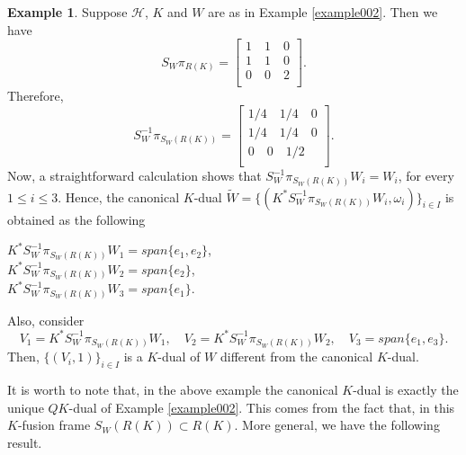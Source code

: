 \documentclass{birkjour}
\theoremstyle{definition}
\newtheorem{ex}[thm]{Example}
\theoremstyle{remark}
\numberwithin{equation}{section}
\begin{document}
\begin{ex}\label{example2}
Suppose  $\mathcal{H}$, $K$ and $W$  are as in Example \ref{example002}. Then 
we have
\begin{equation*}
S_{W}\pi_{R(K)} = \left[
 \begin{array}{ccc}

1 \quad 1 \quad 0\\

1 \quad 1 \quad 0\\

0 \quad 0 \quad 2\\

\end{array} \right].
\end{equation*}
Therefore,
\begin{equation*}
S_{W}^{-1}\pi_{S_{W}(R(K))} = \left[
 \begin{array}{ccc}

1/4 \quad 1/4 \quad 0\\

1/4 \quad 1/4 \quad 0\\

0 \quad 0 \quad 1/2\\

\end{array} \right].
\end{equation*}
Now, a straightforward calculation shows that
$S_{W}^{-1}\pi_{S_{W}(R(K))}W_{i} = W_{i}$, for every $1 \leq i\leq 3$. Hence, the canonical $K$-dual $\widetilde{W} = \lbrace
(K^{*}S_{W}^{-1}\pi_{S_{W}(R(K))}W_{i},\omega_{i})\rbrace_{i\in I}$ is obtained as the following

\begin{center}
$K^{*}S_{W}^{-1}\pi_{S_{W}(R(K))} W_{1} =  \textit{span}\lbrace e_{1}, e_{2}\rbrace$, \\
$K^{*}S_{W}^{-1}\pi_{S_{W}(R(K))} W_{2} =  \textit{span}\lbrace e_{2}\rbrace$, \\
$K^{*}S_{W}^{-1}\pi_{S_{W}(R(K))} W_{3} =  \textit{span}\lbrace e_{1}\rbrace$.
\end{center}
Also, consider
\begin{equation*}
V_{1} = K^{*}S_{W}^{-1}\pi_{S_{W}(R(K))} W_{1},\quad V_{2} =K^{*}S_{W}^{-1}\pi_{S_{W}(R(K))} W_{2},\quad V_{3} = \textit{span}\lbrace e_{1}, e_{3}\rbrace.
\end{equation*}
Then, $\{(V_{i}, 1)\}_{i\in I}$ is a $K$-dual of $W$ different from the canonical $K$-dual.
\end{ex}
It is worth to note that, in the above example the canonical $K$-dual is exactly the unique $QK$-dual of Example \ref{example002}. This comes from the fact that, in this $K$-fusion frame $S_{W}(R(K))\subset R(K)$. More general,  we have the following result.
\end{document}
